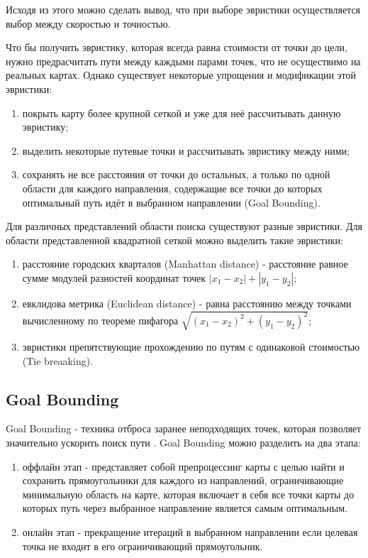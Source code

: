 Исходя из этого можно сделать вывод, что при выборе эвристики осуществляется выбор между скоростью и точностью.

Что бы получить эвристику, которая всегда равна стоимости от точки до цели, нужно предрасчитать пути между каждыми парами точек, что не осуществимо на реальных картах. Однако существует некоторые упрощения и модификации этой эвристики:

\begin{enumerate}
	\item покрыть карту более крупной сеткой и уже для неё рассчитывать данную эвристику;
	\item выделить некоторые путевые точки и рассчитывать эвристику между ними;
	\item сохранять не все расстояния от точки до остальных, а только по одной области для каждого направления, содержащие все точки до которых оптимальный путь идёт в выбранном направлении (Goal Bounding).
\end{enumerate}

Для различных представлений области поиска существуют разные эвристики. Для области представленной квадратной сеткой можно выделить такие эвристики:

\begin{enumerate}
	\item расстояние городских кварталов (Manhattan distance) - расстояние равное сумме модулей разностей координат точек $|x_1 - x_2| + |y_1-y_2|$;
	\item евклидова метрика (Euclidean distance) - равна расстоянию между точками вычисленному по теореме пифагора $\sqrt{(x_1 - x_2)^2 + (y_1 - y_2)^2}$;
	\item эвристики препятствующие прохождению по путям с одинаковой стоимостью (Tie breaaking).
\end{enumerate} 

\subsection{Goal Bounding}

Goal Bounding - техника отброса заранее неподходящих точек, которая позволяет значительно ускорить поиск пути \cite{GOAL_BOUNDING}. Goal Bounding можно разделить на два этапа:

\begin{enumerate}
	\item оффлайн этап - представляет собой препроцессинг карты с целью найти и сохранить прямоугольники для каждого из направлений, ограничивающие минимальную область на карте, которая включает в себя все точки карты до которых путь через выбранное направление является самым оптимальным.
	\item онлайн этап - прекращение итераций в выбранном направлении если целевая точка не входит в его ограничивающий прямоугольник.
\end{enumerate}
 
